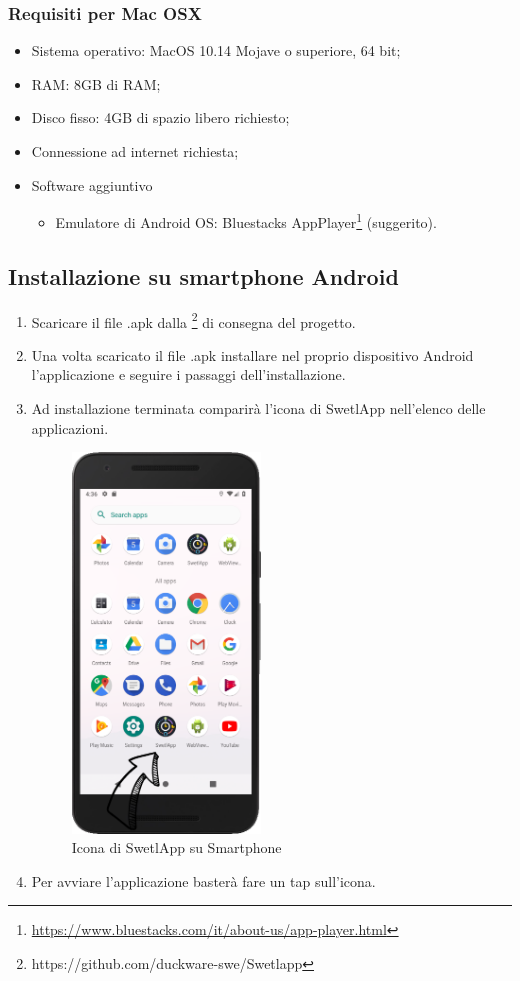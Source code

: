 \subsubsection{Requisiti per Mac OSX}
\label{sec:requisiti_mac}
\begin{itemize}
	\item Sistema operativo: MacOS 10.14 Mojave o superiore, 64 bit;
	\item RAM: 8GB di RAM;
	\item Disco fisso: 4GB di spazio libero richiesto;
	\item Connessione ad internet richiesta;
	\item Software aggiuntivo
	\begin{itemize}
		\item Emulatore di Android OS: Bluestacks AppPlayer\footnote{\href{https://www.bluestacks.com/it/about-us/app-player.html}{https://www.bluestacks.com/it/about-us/app-player.html}} (suggerito).
	\end{itemize}
\end{itemize}
\subsection{Installazione su smartphone Android}
\begin{enumerate}
	\item Scaricare il file .apk dalla \footnote{https://github.com/duckware-swe/Swetlapp} di consegna del progetto.
	\item Una volta scaricato il file .apk installare nel proprio dispositivo Android l'applicazione e seguire i passaggi dell'installazione.
	\item Ad installazione terminata comparirà l'icona di SwetlApp nell'elenco delle applicazioni.
	\begin{figure}[htbp]
		\centering
		\includegraphics[width=5cm]{../includes/pics/screen1.PNG}
		\caption{\label{fig:screen1}Icona di SwetlApp su Smartphone}
	\end{figure}
	\item Per avviare l'applicazione basterà fare un tap sull'icona.
\end{enumerate}



